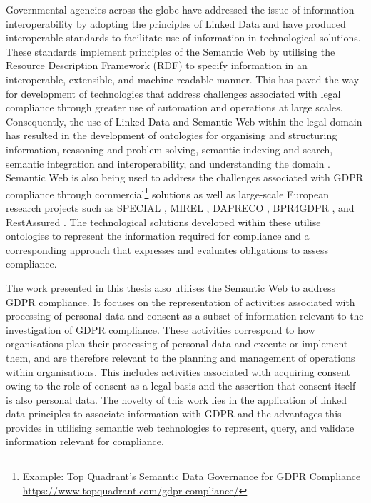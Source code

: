 Governmental agencies across the globe have addressed the issue of information interoperability by adopting the principles of Linked Data \cite{bizer_linked_2011} and have produced interoperable standards \cite{palmirani_akoma_2018,european_union_eli_2015,van_opijnen_european_2011} to facilitate use of information in technological solutions.
These standards implement principles of the Semantic Web \cite{semantic-web} by utilising the Resource Description Framework (RDF) \cite{RDF} to specify information in an interoperable, extensible, and machine-readable manner.
This has paved the way for development of technologies that address challenges associated with legal compliance through greater use of automation and operations at large scales.
Consequently, the use of Linked Data and Semantic Web within the legal domain has resulted in the development of ontologies for organising and structuring information, reasoning and problem solving, semantic indexing and search, semantic integration and interoperability, and understanding the domain \cite{rodrigues_legal_2019}.
Semantic Web is also being used to address the challenges associated with GDPR compliance through commercial\footnote{Example: Top Quadrant's Semantic Data Governance for GDPR Compliance \url{https://www.topquadrant.com/gdpr-compliance/}} solutions as well as large-scale European research projects such as SPECIAL \cite{SPECIAL}, MIREL \cite{MIREL}, DAPRECO \cite{DAPRECO}, BPR4GDPR \cite{BPR4GDPR}, and RestAssured \cite{RestAssured}.
The technological solutions developed within these utilise ontologies to represent the information required for compliance and a corresponding approach that expresses and evaluates obligations to assess compliance.

The work presented in this thesis also utilises the Semantic Web to address GDPR compliance. It focuses on the representation of activities associated with processing of personal data and consent as a subset of information relevant to the investigation of GDPR compliance. These activities correspond to how organisations plan their processing of personal data and execute or implement them, and are therefore relevant to the planning and management of operations within organisations.
This includes activities associated with acquiring consent owing to the role of consent as a legal basis and the assertion that consent itself is also personal data.
The novelty of this work lies in the application of linked data principles to associate information with GDPR and the advantages this provides in utilising semantic web technologies to represent, query, and validate information relevant for compliance.

